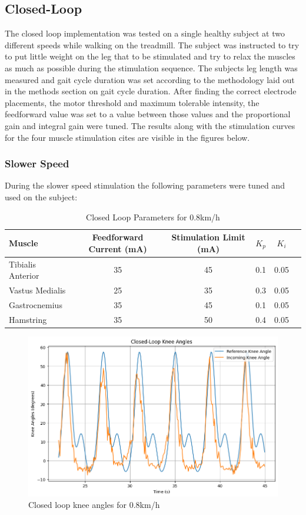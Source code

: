\subsection{Closed-Loop}
The closed loop implementation was tested on a single healthy subject at two different speeds while walking on the treadmill. The subject was instructed to try to put little weight on the leg that to be stimulated and try to relax the muscles as much as possible during the stimulation sequence. The subjects leg length was measured and gait cycle duration was set according to the methodology laid out in the methods section on gait cycle duration. After finding the correct electrode placements, the motor threshold and maximum tolerable intensity, the feedforward value was set to a value between those values and the proportional gain and integral gain were tuned.  The results along with the stimulation curves for the four muscle stimulation cites are visible in the figures below.

\subsubsection{Slower Speed}
During the slower speed stimulation the following parameters were tuned and used on the subject:

\begin{table}[h!]
\centering
\caption{Closed Loop Parameters for 0.8km/h}
\begin{tabular}{|l|c|c|c|c|c|}
\hline
\textbf{Muscle} & \textbf{Feedforward Current (mA)} & \textbf{Stimulation Limit (mA)} & \textbf{$K_p$} & \textbf{$K_i$} \\ \hline
Tibialis Anterior  & 35 & 45 & 0.1 & 0.05 \\ \hline
Vastus Medialis    & 25 & 35 & 0.3 & 0.05 \\ \hline
Gastrocnemius      & 35 & 45 & 0.1 & 0.05 \\ \hline
Hamstring          & 35 & 50 & 0.4 & 0.05 \\ \hline
\end{tabular}
\label{tab:closed_loop_9}
\end{table}

\begin{figure} [H]
    \centering
    \includegraphics[width=0.95\linewidth]{images/CL9refpng.png}
    \caption{Closed loop knee angles for 0.8km/h}
    \label{fig:cl9ref}
\end{figure}

